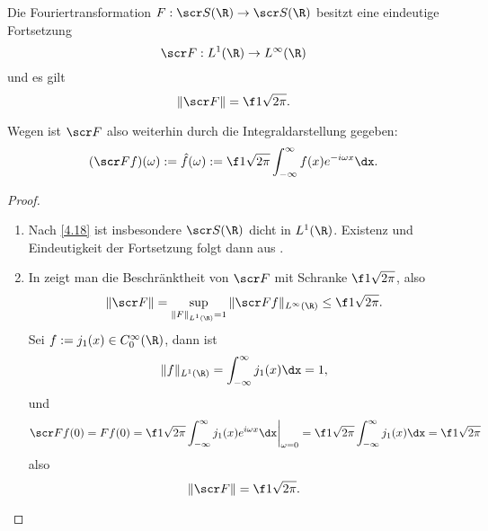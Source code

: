 \begin{st} \label{4.24}
	Die Fouriertransformation $F: \scr S(\R) \to \scr S(\R)$ besitzt eine eindeutige Fortsetzung
	\[
		\scr F: L^1(\R) \to L^\infty(\R)
	\]
	und es gilt
	\[
		\|\scr F\| = \f 1{\sqrt{2\pi}}.
	\]
	\begin{note}
		Wegen  ist $\scr F$ also weiterhin durch die Integraldarstellung gegeben:
		\[
			(\scr F f)(\omega)
			:= \hat f (\omega)
			:= \f 1{\sqrt{2\pi}} \int_{-\infty}^\infty f(x) e^{-i\omega x} \dx.
		\]
	\end{note}
	\begin{proof}
		\begin{enumerate}[1)]
			\item
				Nach \ref{4.18} ist insbesondere $\scr S(\R)$ dicht in $L^1(\R)$.
				Existenz und Eindeutigkeit der Fortsetzung folgt dann aus .
			\item
				In  zeigt man die Beschränktheit von $\scr F$ mit Schranke $\f 1{\sqrt{2\pi}}$, also
				\[
					\| \scr F\| = \sup_{\|F\|_{L^1(\R)}=1} \|\scr F f\|_{L^\infty(\R)} \le \f 1{\sqrt{2\pi}}.
				\]
				Sei $f := j_1(x) \in C_0^\infty(\R)$, dann ist
				\[
					\|f\|_{L^1(\R)} = \int_{-\infty}^\infty j_1(x) \dx = 1,
				\]
				und
				\[
					\scr F f(0)
					= F f(0)
					= \f 1{\sqrt{2\pi}} \int_{-\infty}^\infty j_1(x) e^{i\omega x} \dx \bigg|_{\omega = 0}
					= \f 1{\sqrt{2\pi}} \int_{-\infty}^\infty j_1(x) \dx
					= \f 1{\sqrt{2\pi}}
				\]
				also
				\[
					\| \scr F\| = \f 1{\sqrt{2\pi}}.
				\]
		\end{enumerate}
	\end{proof}
\end{st}

